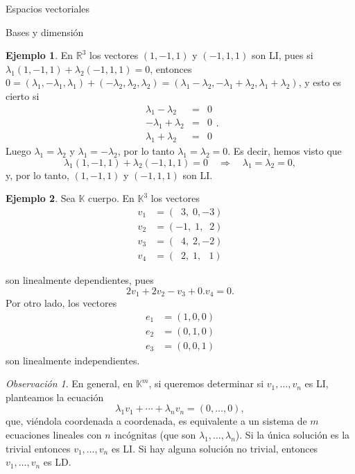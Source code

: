 \documentclass[a4paper,12pt,twoside,spanish,reqno]{amsbook}
\theoremstyle{definition}
\newtheorem{ejemplo}{Ejemplo}[section]
\theoremstyle{remark}
\newtheorem{observacion}{Observaci\'on}[section]
\newcommand{\R}{\mathbb R}
\newcommand{\K}{\mathbb K}
\begin{document}
\begin{chapter}{Espacios vectoriales}
\begin{section}{Bases y dimensión}
\begin{ejemplo}
    En $\R^3$  los vectores $(1,-1,1)$ y $(-1,1,1)$ son LI, pues si $\lambda_1(1,-1,1)+\lambda_2(-1,1,1) =0$,  entonces $0= (\lambda_1,-\lambda_1,\lambda_1)+(-\lambda_2,\lambda_2,\lambda_2) =  (\lambda_1-\lambda_2,-\lambda_1+\lambda_2,\lambda_1+\lambda_2)$, y esto es cierto si 
    \begin{equation*}
        \begin{array}{rcl}
        \lambda_1-\lambda_2 &=& 0 \\
        -\lambda_1+\lambda_2 &=& 0 \\
        \lambda_1+\lambda_2 &=& 0 
        \end{array}.
    \end{equation*} 
    Luego $\lambda_1 = \lambda_2$ y $\lambda_1 = -\lambda_2$, por lo tanto $\lambda_1 = \lambda_2 =0$. Es decir,  hemos visto que 
    $$
    \lambda_1(1,-1,1)+\lambda_2(-1,1,1) =0 \quad \Rightarrow \quad\lambda_1 = \lambda_2 =0,
    $$
    y, por lo tanto,  $(1,-1,1)$ y $(-1,1,1)$ son LI.
\end{ejemplo}

\begin{ejemplo} Sea $\K$  cuerpo. En $\K^3$ los vectores
    \begin{align*}
    v_1 &= (\;\;3,\;0,-3) \\
    v_2 &= (-1,\;1,\;\;2) \\
    v_3 &= (\;\;4,\;2,-2) \\
    v_4 &= (\;\;2,\;1,\,\;\;1)
    \end{align*}
    
    son linealmente dependientes, pues
    $$
    2v_1+2v_2 -v_3 +0.v_4 =0.
    $$
    Por otro lado, los vectores
    \begin{align*}
    e_1 &= (1,0,0) \\
    e_2 &= (0,1,0) \\
    e_3 &= (0,0,1) 
    \end{align*}
    son linealmente independientes.
\end{ejemplo}


\begin{observacion}
    En  general,  en $\K^m$, si queremos determinar si  $v_1,\ldots,v_n$ es LI, planteamos la ecuación  
    \begin{equation*}
    \lambda_1v_1+\cdots+\lambda_nv_n=(0,\ldots,0),
    \end{equation*}
    que, viéndola coordenada a coordenada, es equivalente a un sistema de $m$ ecuaciones lineales con  $n$ incógnitas (que son $\lambda_1,\ldots,\lambda_n$). Si  la única solución es la trivial entonces $v_1,\ldots,v_n$ es LI. Si hay alguna solución no trivial, entonces $v_1,\ldots,v_n$ es LD. 
\end{observacion}
 

\end{section}
\end{chapter}
\end{document}
